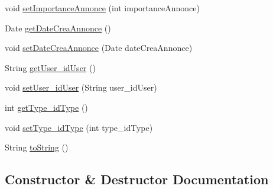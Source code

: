 \begin{DoxyCompactItemize}
\item 
void \hyperlink{classcom_1_1ecetech_1_1bti4_1_1itproject_1_1classified_1_1beans_1_1_annonce_a32208640ee6f59f673c76f6016b6a844}{set\+Importance\+Annonce} (int importance\+Annonce)
\item 
Date \hyperlink{classcom_1_1ecetech_1_1bti4_1_1itproject_1_1classified_1_1beans_1_1_annonce_ae75fd16b2d0d9cd626f144a0fffba105}{get\+Date\+Crea\+Annonce} ()
\item 
void \hyperlink{classcom_1_1ecetech_1_1bti4_1_1itproject_1_1classified_1_1beans_1_1_annonce_a9b7042f66a8889cd671dfe760350fa9b}{set\+Date\+Crea\+Annonce} (Date date\+Crea\+Annonce)
\item 
String \hyperlink{classcom_1_1ecetech_1_1bti4_1_1itproject_1_1classified_1_1beans_1_1_annonce_a536033fbd2e02d7aca69046a7bba0aed}{get\+User\+\_\+id\+User} ()
\item 
void \hyperlink{classcom_1_1ecetech_1_1bti4_1_1itproject_1_1classified_1_1beans_1_1_annonce_a26d73580749190bff31f2c7e37579747}{set\+User\+\_\+id\+User} (String user\+\_\+id\+User)
\item 
int \hyperlink{classcom_1_1ecetech_1_1bti4_1_1itproject_1_1classified_1_1beans_1_1_annonce_a2928de07f8e1c48c74fa2a105bbec070}{get\+Type\+\_\+id\+Type} ()
\item 
void \hyperlink{classcom_1_1ecetech_1_1bti4_1_1itproject_1_1classified_1_1beans_1_1_annonce_a06b9beb37ec893be929f22447d697d0e}{set\+Type\+\_\+id\+Type} (int type\+\_\+id\+Type)
\item 
String \hyperlink{classcom_1_1ecetech_1_1bti4_1_1itproject_1_1classified_1_1beans_1_1_annonce_ac85dded6032ab20c1c650c2ce4de1981}{to\+String} ()
\end{DoxyCompactItemize}


\subsection{Constructor \& Destructor Documentation}
